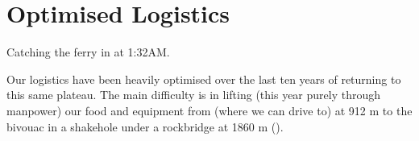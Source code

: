 \section{Optimised Logistics}

\begin{marginfigure}
\checkoddpage \ifoddpage \forcerectofloat \else \forceversofloat \fi
\centering
 \caption{Catching the ferry in \protect{} at 1:32AM. }
 \label{ferry 2009}
\end{marginfigure}

Our logistics have been heavily optimised over the last ten years of
returning to this same plateau. The main difficulty is in lifting (this
year purely through manpower) our food and equipment from  (where we can drive to) at 912 m to the bivouac in a shakehole
under a rockbridge at 1860 m ().

